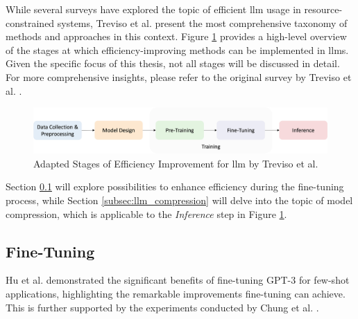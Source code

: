 While several surveys \cite{ling_domain_2023, zhao_survey_2023} have explored the topic of efficient \gls{llm} usage in resource-constrained systems, Treviso et al. \cite{treviso_efficient_2023} present the most comprehensive taxonomy of methods and approaches in this context. Figure \ref{fig:llm_taxonomy} provides a high-level overview of the stages at which efficiency-improving methods can be implemented in \gls{llm}s. Given the specific focus of this thesis, not all stages will be discussed in detail. For more comprehensive insights, please refer to the original survey by Treviso et al. \cite{treviso_efficient_2023}.

\begin{figure}
    \centering
    \includegraphics[width=\textwidth]{Grafiken/Efficient_Survey_Steps.png}
    \caption{Adapted Stages of Efficiency Improvement for \gls{llm} by Treviso et al. \cite{treviso_efficient_2023}}
    \label{fig:llm_taxonomy}
\end{figure}

Section \ref{subsec:llm_fine_tuning} will explore possibilities to enhance efficiency during the fine-tuning process, while Section \ref{subsec:llm_compression} will delve into the topic of model compression, which is applicable to the \textit{Inference} step in Figure \ref{fig:llm_taxonomy}.



\subsection{Fine-Tuning}
\label{subsec:llm_fine_tuning}

Hu et al. \cite{hu_lora_nodate} demonstrated the significant benefits of fine-tuning GPT-3 for few-shot applications, highlighting the remarkable improvements fine-tuning can achieve. This is further supported by the experiments conducted by Chung et al. \cite{chung_scaling_2022}.


